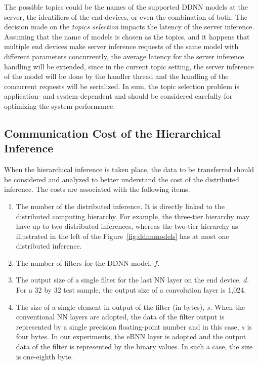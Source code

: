 \documentclass[format=acmsmall, review=false, screen=true]{acmart}
\def\figurename{Figure}
\begin{document}
The possible topics could be the names of the supported DDNN models at the server, the identifiers of the end devices, or even the combination of both. The decision made on the \emph{topics selection} impacts the latency of the server inference. Assuming that the name of models is chosen as the topics, and it happens that multiple end devices make server inference requests of the same model with different parameters concurrently, the average latency for the server inference handling will be extended, since in the current topic setting, the server inference of the model will be done by the handler thread and the handling of the concurrent requests will be serialized. In sum, the topic selection problem is application- and system-dependent and should be considered carefully for optimizing the system performance.

\subsection{Communication Cost of the Hierarchical Inference}
\label{sec:commcost}
When the hierarchical inference is taken place, the data to be transferred should be considered and analyzed to better understand the cost of the distributed inference. The costs are associated with the following items.
\begin{enumerate}
  \item The number of the distributed inference. It is directly linked to the distributed computing hierarchy. For example, the three-tier hierarchy may have up to two distributed inferences, whereas the two-tier hierarchy as illustrated in the left of the \figurename~\ref{fig:ddnnmodels} has at most one distributed inference.
  \item The number of filters for the DDNN model, $f$.
  \item The output size of a single filter for the last NN layer on the end device, $d$. For a 32 by 32 test sample, the output size of a convolution layer is 1,024.
  \item The size of a single element in output of the filter (in bytes), $s$. When the conventional NN layers are adopted, the data of the filter output is represented by a single precision floating-point number and in this case, $s$ is four bytes. In our experiments, the eBNN layer is adopted and the output data of the filter is represented by the binary values. In such a case, the size is one-eighth byte.
\end{enumerate}
\end{document}
